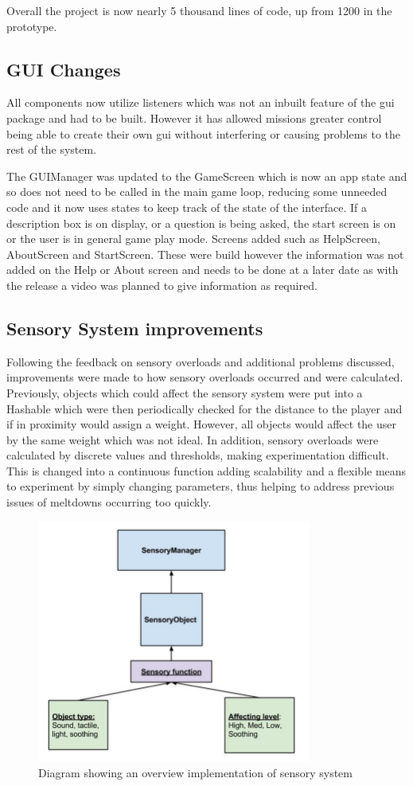 \documentclass[11pt]{report}
\begin{document}
Overall the project is now nearly 5 thousand lines of code, up from 1200 in the prototype. 

\subsection{GUI Changes}
All components now utilize listeners which was not an inbuilt feature of the gui package and had to be built. However it has allowed missions greater control being able to create their own gui without interfering or causing problems to the rest of the system.

The GUIManager was updated to the GameScreen which is now an app state and so does not need to be called in the main game loop, reducing some unneeded code and it now uses states to keep track of the state of the interface. If a description box is on display, or a question is being asked, the start screen is on or the user is in general game play mode. Screens added such as HelpScreen, AboutScreen and StartScreen. These were build however the information was not added on the Help or About screen and needs to be done at a later date as with the release a video was planned to give information as required. 


\subsection{Sensory System improvements}
Following the feedback on sensory overloads and additional problems discussed, improvements were made to how sensory overloads occurred and were calculated. Previously, objects which could affect the sensory system were put into a Hashable which were then periodically checked for the distance to the player and if in proximity would assign a weight. However, all objects would affect the user by the same weight which was not ideal. In addition, sensory overloads were calculated by discrete values and thresholds, making experimentation difficult. This is changed into a continuous function adding scalability and a flexible means to experiment by simply changing parameters, thus helping to address previous issues of meltdowns occurring too quickly.

\begin{figure}[H]
\centering
\includegraphics[width=90mm]{images/sensoryobjects.jpg}
\caption{Diagram showing an overview implementation of sensory system}
\label{sensorysystem}
\end{figure}
\end{document}
